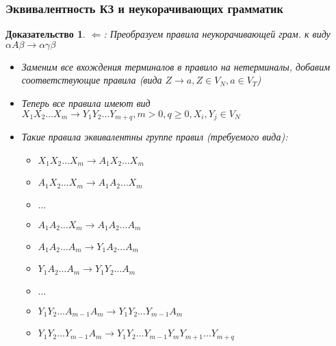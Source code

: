 \documentclass{beamer}
\newtheorem{ruproof}{Доказательство}
\begin{document}
\begin{frame}[fragile]
  \transwipe[direction=90]
  \frametitle{Эквивалентность КЗ и неукорачивающих грамматик}

\begin{ruproof}
$\Leftarrow$: Преобразуем правила неукорачивающей грам. к виду $\alpha A \beta \rightarrow \alpha \gamma \beta$

\begin{itemize}
  \item Заменим все вхождения терминалов в правило на нетерминалы, добавим соответствующие правила (вида $Z \rightarrow a, Z \in V_N, a \in V_T$)
  \item Теперь все правила имеют вид $X_1 X_2 \dots X_m \rightarrow Y_1 Y_2 \dots Y_{m+q}, m > 0, q \geq 0, X_i, Y_j \in V_N$
  \item Такие правила эквивалентны группе правил (требуемого вида):
  \begin{itemize}
    \item $X_1 X_2 \dots X_m \rightarrow A_1 X_2 \dots X_m$
    \item $A_1 X_2 \dots X_m \rightarrow A_1 A_2 \dots X_m$
    \item $\dots$
    \item $A_1 A_2 \dots X_m \rightarrow A_1 A_2 \dots A_m$
    \item $A_1 A_2 \dots A_m \rightarrow Y_1 A_2 \dots A_m$
    \item $Y_1 A_2 \dots A_m \rightarrow Y_1 Y_2 \dots A_m$
    \item $\dots$
    \item $Y_1 Y_2 \dots A_{m - 1} A_m \rightarrow Y_1 Y_2 \dots Y_{m-1} A_m$
    \item $Y_1 Y_2 \dots Y_{m - 1} A_m \rightarrow Y_1 Y_2 \dots Y_{m-1} Y_m Y_{m+1} \dots Y_{m+q}$
  \end{itemize}
\end{itemize}
\end{ruproof}

\end{frame}
\end{document}
